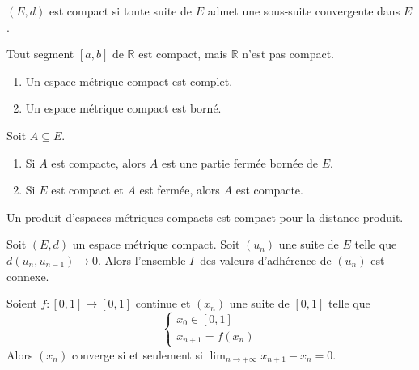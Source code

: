 	\begin{theorem}
		$(E,d)$ est compact si toute suite de $E$ admet une sous-suite convergente dans $E$.
	\end{theorem}

	\begin{example}
		Tout segment $[a,b]$ de $\mathbb{R}$ est compact, mais $\mathbb{R}$ n'est pas compact.
	\end{example}

	\begin{proposition}
		\begin{enumerate}[label=(\roman*)]
			\item Un espace métrique compact est complet.
			\item Un espace métrique compact est borné.
		\end{enumerate}
	\end{proposition}

	\begin{proposition}
		Soit $A \subseteq E$.
		\begin{enumerate}[label=(\roman*)]
			\item Si $A$ est compacte, alors $A$ est une partie fermée bornée de $E$.
			\item Si $E$ est compact et $A$ est fermée, alors $A$ est compacte.
		\end{enumerate}
	\end{proposition}

	\begin{proposition}
		Un produit d'espaces métriques compacts est compact pour la distance produit.
	\end{proposition}


	\begin{application}
		Soit $(E, d)$ un espace métrique compact. Soit $(u_n)$ une suite de $E$ telle que $d(u_n,u_{n-1}) \longrightarrow 0$. Alors l'ensemble $\Gamma$ des valeurs d'adhérence de $(u_n)$ est connexe.
	\end{application}

	\begin{corollary}
		Soient $f : [0, 1] \rightarrow [0, 1]$ continue et $(x_n)$ une suite de $[0, 1]$ telle que
		\[ \begin{cases} x_0 \in [0, 1] \\ x_{n+1} = f(x_n) \end{cases} \]
		Alors $(x_n)$ converge si et seulement si $\lim_{n \rightarrow +\infty } x_{n+1} - x_n = 0$.
	\end{corollary}

